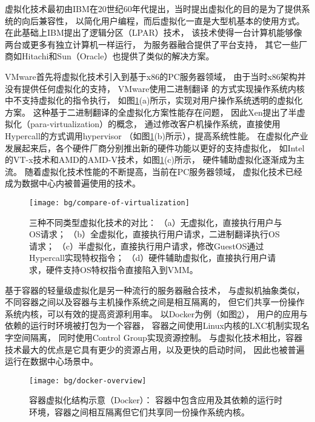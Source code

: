虚拟化技术最初由IBM在20世纪60年代提出，当时提出虚拟化的目的是为了提供系统的向后兼容性，
以简化用户编程，而后虚拟化一直是大型机基本的使用方式。
在此基础上IBM提出了逻辑分区（LPAR）\cite{IBM_LPAR:2007}技术，
该技术使得一台计算机能够像两台或更多有独立计算机一样运行，
为服务器融合提供了平台支持，
其它一些厂商如Hitachi\cite{hitachi-lpar}和Sun（Oracle）\cite{LDom}也提供了类似的解决方案。

VMware首先将虚拟化技术引入到基于x86的PC服务器领域，
由于当时x86架构并没有提供任何虚拟化的支持，
VMware使用二进制翻译\cite{vmware-compare-hw-sw:2006}
的方式实现操作系统内核中不支持虚拟化的指令执行，
如图\ref{fig:compare-of-virt}(a)所示，实现对用户操作系统透明的虚拟化方案。
这种基于二进制翻译的全虚拟化方案性能存在问题，
因此Xen提出了半虚拟化（para-virtualization）\cite{barham_xen_2003}的概念，
通过修改客户机操作系统，直接使用Hypercall的方式调用hypervisor
（如图\ref{fig:compare-of-virt}(b)所示），提高系统性能。
在虚拟化产业发展起来后，各个硬件厂商分别推出新的硬件功能以更好的支持虚拟化，
如Intel的VT-x技术和AMD的AMD-V技术，如图\ref{fig:compare-of-virt}(c)所示，
硬件辅助虚拟化逐渐成为主流。
随着虚拟化技术性能的不断提高，当前在PC服务器领域，
虚拟化技术已经成为数据中心内被普遍使用的技术。

\begin{figure}[t]
  \centering
  \texttt{[image: bg/compare-of-virtualization]}
  \caption[三种不同类型虚拟化技术的对比]{三种不同类型虚拟化技术的对比：
    （a）无虚拟化，直接执行用户与OS请求；
    （b）全虚拟化，直接执行用户请求，二进制翻译执行OS请求；
    （c）半虚拟化，直接执行用户请求，修改GuestOS通过Hypercall实现特权指令；
    （d）硬件辅助虚拟化，直接执行用户请求，硬件支持OS特权指令直接陷入到VMM。}
  \label{fig:compare-of-virt}
\end{figure}

基于容器的轻量级虚拟化是另一种流行的服务器融合技术，
与虚拟机抽象类似，不同容器之间以及容器与主机操作系统之间是相互隔离的，
但它们共享一份操作系统内核，可以有效的提高资源利用率。
以Docker为例（如图\ref{fig:docker-overview}），
用户的应用与依赖的运行时环境被打包为一个容器，
容器之间使用Linux内核的LXC\cite{lxc}机制实现名字空间隔离，
同时使用Control Group\cite{cgroup}实现资源控制。
与虚拟化技术相比，容器技术最大的优点是它具有更少的资源占用，以及更快的启动时间，
因此也被普遍运行在数据中心场景中。

\begin{figure}[htb]
  \centering
  \begin{minipage}{0.75\textwidth}
    \texttt{[image: bg/docker-overview]}
    \caption[容器虚拟化结构示意（Docker）]{容器虚拟化结构示意（Docker）：
      容器中包含应用及其依赖的运行时环境，容器之间相互隔离但它们共享同一份操作系统内核。}
    \label{fig:docker-overview}
  \end{minipage}
\end{figure}

